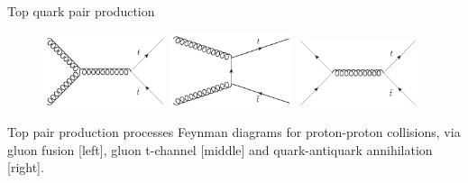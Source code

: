 \begin{frame}{Top quark pair production}
\vspace{-.2cm}
\begin{figure}[!Hhtbp]
  \begin{center}
    \includegraphics[width=0.32\textwidth]{../figs/Gluon_fusion_top_pair.jpg}
    \includegraphics[width=0.32\textwidth]{../figs/Gluon_tchannel_top_pair.jpg}
    \includegraphics[width=0.32\textwidth]{../figs/Quarks_schannel_top_pair.jpg}
  \end{center}
\end{figure}

\vspace{-.2cm}
    \begin{block}{}
      \tiny \centering Top pair production processes Feynman diagrams for proton-proton collisions, via gluon fusion [left], gluon t-channel [middle] and quark-antiquark annihilation [right].
    \end{block}

\end{frame}

